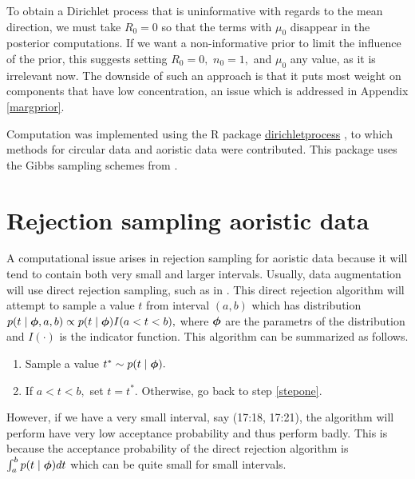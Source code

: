 To obtain a Dirichlet process that is uninformative with regards to the mean direction, we must take $R_0 = 0$ so that the terms with $\mu_0$ disappear in the posterior computations. If we want a non-informative prior to limit the  influence of the prior, this suggests setting $R_0 = 0,$ $n_0 = 1,$ and $\mu_0$ any value, as it is irrelevant now. The downside of such an approach is that it puts most weight on components that have low concentration, an issue which is addressed in Appendix \ref{margprior}.

Computation was implemented using the R package \href{https://cran.r-project.org/web/packages/dirichletprocess/index.html}{dirichletprocess} \citep{dirichletprocesspackage}, to which methods for circular data and aoristic data were contributed. This package uses the Gibbs sampling schemes from \citet{neal2000markov}.

\newpage

\section{Rejection sampling aoristic data} \label{rejsampling}

A computational issue arises in rejection sampling for aoristic data because it will tend to contain both very small and larger intervals. Usually, data augmentation will use direct rejection sampling, such as in \citet{doss1994bayesian}. This direct rejection algorithm will attempt to sample a value $t$ from interval $(a, b)$ which has distribution $p(t \mid \boldsymbol{\phi}, a, b) \propto p(t \mid \boldsymbol{\phi}) I(a < t < b), $  where $\boldsymbol{\phi}$ are the parametrs of the distribution and $I(\cdot)$ is the indicator function. This algorithm can be summarized as follows.
\begin{enumerate}
\item Sample a value $t^\ast \sim p(t \mid \boldsymbol{\phi}).$ \label{stepone}
\item If $a < t < b,$ set $t = t^\ast.$ Otherwise, go back to step \ref{stepone}.
\end{enumerate}
However, if we have a very small interval, say (17:18, 17:21), the algorithm will perform have very low acceptance probability and thus perform badly. This is because the acceptance probability of the direct rejection algorithm is $\int_{a}^{b} p(t \mid \boldsymbol{\phi}) dt$ which can be quite small for small intervals.

